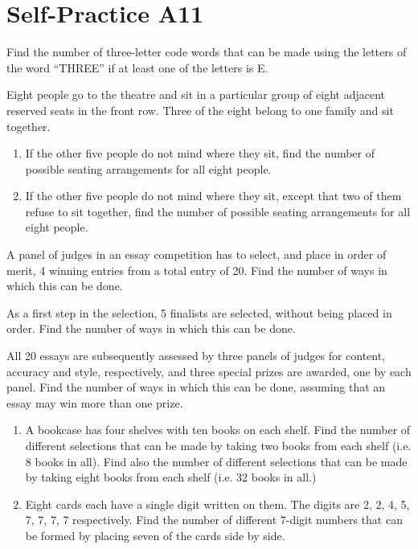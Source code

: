 \section{Self-Practice A11}

\begin{problem}
    Find the number of three-letter code words that can be made using the letters of the word ``THREE'' if at least one of the letters is E. 
\end{problem}

\begin{problem}
    Eight people go to the theatre and sit in a particular group of eight adjacent reserved seats in the front row. Three of the eight belong to one family and sit together. 
    
    \begin{enumerate}
        \item If the other five people do not mind where they sit, find the number of possible seating arrangements for all eight people.
        \item If the other five people do not mind where they sit, except that two of them refuse to sit together, find the number of possible seating arrangements for all eight people.
    \end{enumerate}
\end{problem}

\begin{problem}
    A panel of judges in an essay competition has to select, and place in order of merit, 4 winning entries from a total entry of 20. Find the number of ways in which this can be done.

    As a first step in the selection, 5 finalists are selected, without being placed in order. Find the number of ways in which this can be done.
    
    All 20 essays are subsequently assessed by three panels of judges for content, accuracy and style, respectively, and three special prizes are awarded, one by each panel. Find the number of ways in which this can be done, assuming that an essay may win more than one prize.
\end{problem}

\begin{problem}
    \begin{enumerate}
        \item A bookcase has four shelves with ten books on each shelf. Find the number of different selections that can be made by taking two books from each shelf (i.e. 8 books in all). Find also the number of different selections that can be made by taking eight books from each shelf (i.e. 32 books in all.)
        \item Eight cards each have a single digit written on them. The digits are 2, 2, 4, 5, 7, 7, 7, 7 respectively. Find the number of different 7-digit numbers that can be formed by placing seven of the cards side by side.
    \end{enumerate}
\end{problem}

